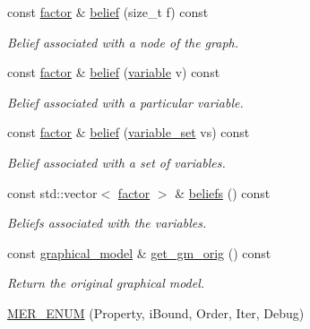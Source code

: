 \begin{DoxyCompactItemize}
const \hyperlink{classmerlin_1_1factor}{factor} \& \hyperlink{classmerlin_1_1jglp_a75fe3423fa5f1d46f5878de99f732ed4}{belief} (size\+\_\+t f) const 
\begin{DoxyCompactList}\small\item\em Belief associated with a node of the graph. \end{DoxyCompactList}\item 
const \hyperlink{classmerlin_1_1factor}{factor} \& \hyperlink{classmerlin_1_1jglp_ab682129e900ebd41c44b0516e7997a9e}{belief} (\hyperlink{classmerlin_1_1variable}{variable} v) const 
\begin{DoxyCompactList}\small\item\em Belief associated with a particular variable. \end{DoxyCompactList}\item 
const \hyperlink{classmerlin_1_1factor}{factor} \& \hyperlink{classmerlin_1_1jglp_abc9393073179fadfd12999faea87a62c}{belief} (\hyperlink{classmerlin_1_1variable__set}{variable\+\_\+set} vs) const 
\begin{DoxyCompactList}\small\item\em Belief associated with a set of variables. \end{DoxyCompactList}\item 
const std\+::vector$<$ \hyperlink{classmerlin_1_1factor}{factor} $>$ \& \hyperlink{classmerlin_1_1jglp_a44be9483e6b79d87f70fd7c893d8f70a}{beliefs} () const 
\begin{DoxyCompactList}\small\item\em Beliefs associated with the variables. \end{DoxyCompactList}\item 
const \hyperlink{classmerlin_1_1graphical__model}{graphical\+\_\+model} \& \hyperlink{classmerlin_1_1jglp_adfca7a469dbd9a01486dca85af083b56}{get\+\_\+gm\+\_\+orig} () const \hypertarget{classmerlin_1_1jglp_adfca7a469dbd9a01486dca85af083b56}{}\label{classmerlin_1_1jglp_adfca7a469dbd9a01486dca85af083b56}

\begin{DoxyCompactList}\small\item\em Return the original graphical model. \end{DoxyCompactList}\item 
\hyperlink{classmerlin_1_1jglp_a7a0a5bdfdd803b351d9d86a86fd41029}{M\+E\+R\+\_\+\+E\+N\+UM} (Property, i\+Bound, Order, Iter, Debug)\hypertarget{classmerlin_1_1jglp_a7a0a5bdfdd803b351d9d86a86fd41029}{}\label{classmerlin_1_1jglp_a7a0a5bdfdd803b351d9d86a86fd41029}


\end{DoxyCompactItemize}
